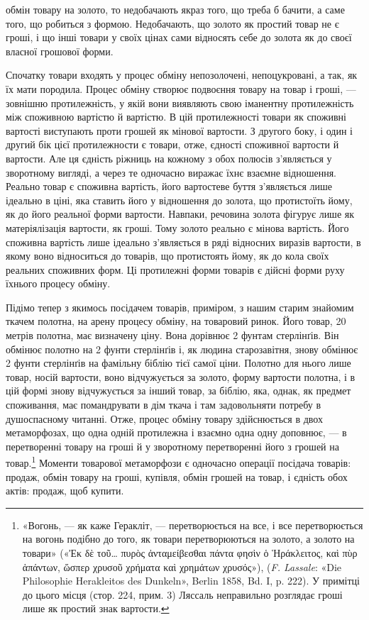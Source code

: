 \parcont{}  %
обмін товару на золото, то недобачають якраз того, що треба б
бачити, а саме того, що робиться з формою. Недобачають, що золото
як простий товар не є гроші, і що інші товари у своїх цінах
сами відносять себе до золота як до своєї власної грошової
форми.

Спочатку товари входять у процес обміну непозолочені, непоцукровані,
а так, як їх мати породила. Процес обміну створює
подвоєння товару на товар і гроші, — зовнішню протилежність,
у якій вони виявляють свою іманентну протилежність між споживною
вартістю й вартістю. В цій протилежності товари як
споживні вартості виступають проти грошей як мінової вартости.
З другого боку, і один і другий бік цієї протилежности
є товари, отже, єдності споживної вартости й вартости. Але ця
єдність ріжниць на кожному з обох полюсів з’являється у зворотному
вигляді, а через те одночасно виражає їхнє взаємне відношення.
Реально товар є споживна вартість, його вартостеве
буття з’являється лише ідеально в ціні, яка ставить його у відношення
до золота, що протистоїть йому, як до його реальної
форми вартости. Навпаки, речовина золота фігурує лише як матеріялізація
вартости, як гроші. Тому золото реально є мінова
вартість. Його споживна вартість лише ідеально з’являється в
ряді відносних виразів вартости, в якому воно відноситься до
товарів, що протистоять йому, як до кола своїх реальних споживних
форм. Ці протилежні форми товарів є дійсні форми руху
їхнього процесу обміну.

Підімо тепер з якимось посідачем товарів, приміром, з нашим
старим знайомим ткачем полотна, на арену процесу обміну, на
товаровий ринок. Його товар, 20 метрів полотна, має визначену
ціну. Вона дорівнює 2 фунтам стерлінґів. Він обмінює полотно
на 2 фунти стерлінґів і, як людина старозавітня, знову обмінює
2 фунти стерлінґів на фамільну біблію тієї самої ціни. Полотно
для нього лише товар, носій вартости, воно відчужується за
золото, форму вартости полотна, і в цій формі знову відчужується
за інший товар, за біблію, яка, однак, як предмет споживання,
має помандрувати в дім ткача і там задовольняти потребу
в душоспасному читанні. Отже, процес обміну товару здійснюється
в двох метаморфозах, що одна одній протилежна і взаємно
одна одну доповнює, — в перетворенні товару на гроші й у зворотному
перетворенні його з грошей на товар.\footnote{
«Вогонь, — як каже Геракліт, — перетворюється на все, і все
перетворюється на вогонь подібно до того, як товари перетворюються на
золото, а золото на товари» («\textgreek{Ἐκ δὲ τοῦ\dots{} πυρὸς ἀνταμείβεσθαι πάντα φησὶν ὁ Ἡράκλειτος, καὶ πὺρ
ἁπάντων, ὥσπερ χρυσοῦ χρήματα καὶ χρημάτων χρυσός}»), (\emph{F. Lassale}:
«Die Philosophie Herakleitos des Dunkeln», Berlin 1858, Bd. I, p. 222).
У примітці до цього місця (стор. 224, прим. 3) Ляссаль неправильно розглядає
гроші лише як простий знак вартости.
} Моменти товарової
метаморфози є одночасно операції посідача товарів: продаж,
обмін товару на гроші, купівля, обмін грошей на товар,
і єдність обох актів: продаж, щоб купити.
